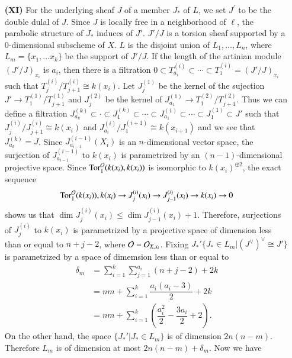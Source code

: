 \begin{itemize}
\item[\bf(XI)] For the underlying sheaf $J$ of a member $J_{*}$ of $L$, we set $J^{'}$ to be the double dulal of $J$. Since $J$ is locally free in a neighborhood of $\ell$, the parabolic structure of $J_{*}$ induces of $J'$. $J'/J$ is a torsion sheaf supported by a 0-dimensional subscheme of $X$. $L$ is the disjoint union of $L_{1}, \ldots, L_{n}$, where $L_{m}=\{x_{1}, \ldots x_{k}\}$ be the support of $J'/J$. If the length of the artinian module $(J'/J)_{x_{i}}$ is $a_{i}$, then there is a filtration $0 \subset T_{a_{i}}^{(i)}\subset \cdots \subset T_{1}^{(i)} = (J'/J)_{x_{i}}$ such that $T_{j}^{(i)}/T_{j+1}^{(i)} \cong k(x_{i})$. Let $J_{j}^{(1)}$ be the kernel of the sujection $J'\rightarrow T_{1}^{(1)} /T_{j+1}^{(1)}$ and $J_{j}^{(2)}$ be the kernel of $J_{a_{1}}^{(1)} \rightarrow T_{1}^{(2)} /T_{j+1}^{(2)}$. Thus we can define a filtration $J_{a_{k}}^{(k)}\subset \cdot \subset J_{1}^{(k)}\subset \cdots\subset J_{a_{1}}^{(1)} \subset \cdots \subset J_{1}^{(1)} \subset J'$ such that $J_{j}^{(i)} /J_{j+1}^{(i)} \cong k(x_{i})$ and $J_{a_{i}}^{(i)} /J_{1}^{(i +1)} \cong k(x_{i+1})$ and we see that $J_{a_{k}}^{(k)}= J$. Since $J_{a_{i-1}}^{(i-1)}(X_{i})$ is an $n$-dimensional vector space, the surjection of $J_{a_{i-1}}^{(i-1)}$ to $k(x_{i})$ is parametrized by an $(n-1)$-dimensional projective space. Since $\operatorname{Tor}_{1}^{\mathcal{O}}(k(x_{i}), k(x_{i}))$ is isomorphic to $k(x_{i})^{\oplus 2}$, the exact sequence
$$
\operatorname{Tor}_{1}^{\mathcal{O}}(k(x_{i})), k(x_{i}) \rightarrow J_{j}^{(i)}(x_{i}) \rightarrow J_{j-1}^{(i)}(x_{i}) \rightarrow k(x_{i})\rightarrow 0
$$
shows us that $\dim J_{j}^{(i)}(x_{i})\leq \dim J_{j-1}^{(i)}(x_{i}) + 1$. Therefore, surjections of $J_{j}^{(i)}$ to $k(x_{i})$ is parametrized by a projective space of dimension less than or equal to $n+j-2$, where $\mathcal{O} = \mathcal{O}_{X, x_{i}}$. Fixing $J_{*}'\{J_{*} \in L_{m} |(J^{\vee})^{\vee} \cong J'\}$ is parametrized by a space of dimemsion less than or equal to
\begin{align*}
\delta_{m}&= \sum\limits_{i=1}^{k}\sum\limits_{j=1}^{a_{i}} (n+j-2) + 2k\\
 &= nm + \sum\limits_{i=1}^{k}\dfrac{a_{i}(a_{i}-3)}{2} + 2k\\
 &= nm + \sum\limits_{i=1}^{k}\left(\dfrac{a_{i}^{2}}{2}-\dfrac{3a_{i}}{2} + 2 \right).
\end{align*}
On the other hand, the space $\{J_{*}' |J_{*} \in L_{m}\}$ is of dimension $2n(n-m)$. Therefore $L_{m}$ is of dimension at most $2n(n-m)+ \delta_{m}$. Now we have
\begin{equation*}

\end{equation*}
\end{itemize}
